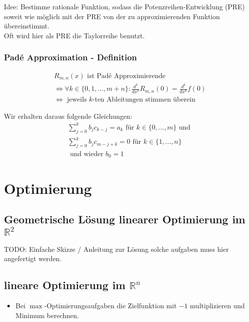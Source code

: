 \documentclass[a4paper]{article}
\newcommand{\R}{\mathbb{R}}
\begin{document}
Idee: Bestimme rationale Funktion, sodass die Potenzreihen-Entwicklung (PRE)
soweit wie möglich mit der PRE von der zu approximierenden Funktion übereinstimmt.
\\

Oft wird hier als PRE die Taylorreihe benutzt.


\subsubsection{Pad\'e Approximation - Definition}

\begin{align*}
	& R_{m, n} (x) \text{ ist Pad\'e Approximierende } \\
	& \Leftrightarrow \forall k \in \{
		0, 1, ..., m+n
	\} : 
	\frac{ d ^{k} }{ d x ^{k} } R_{m, n} (0)
	=
	\frac{ d ^{k} }{ d x ^{k} } f (0) \\
	& \Leftrightarrow \text{ jeweils $k$-ten Ableitungen stimmen überein }
\end{align*}

Wir erhalten daraus folgende Gleichungen:
\begin{align*}
	& \sum_{j=0}^{k} b_j c_{k-j} = a_k
	\text{ für } k \in \{
		0, ..., m
	\} \text{ und } \\
	& \sum_{j=0}^{k} b_j c_{m-j+k} = 0
	\text{ für } k \in \{
		1, ..., n
	\}  \\
	& \text{ und wieder } b_0 = 1
\end{align*}


\section{Optimierung}

\subsection{Geometrische Lösung linearer Optimierung im $\R ^2$}

TODO: Einfache Skizze / Anleitung zur Lösung solche aufgaben muss hier angefertigt
werden.

\subsection{lineare Optimierung im $\R ^{n}$}

\begin{itemize}
	\item Bei $\max$-Optimierungsaufgaben die Zielfunktion mit $-1$
		multiplizieren und Minimum berechnen.
\end{itemize}
\end{document}
